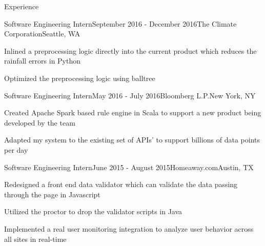\documentclass{resume} %
\begin{document}
\begin{rSection}{Experience}

\begin{rSubsection}{Software Engineering Intern}{September 2016 - December 2016}{The Climate Corporation}{Seattle, WA}
\item Inlined a preprocessing logic directly into the current product which reduces the rainfall errors in Python
\item Optimized the preprocessing logic using balltree

\end{rSubsection}

\begin{rSubsection}{Software Engineering Intern}{May 2016 - July 2016}{Bloomberg L.P.}{New York, NY}
\item Created Apache Spark based rule engine in Scala to support a new product being developed by the team
\item Adapted my system to the existing set of APIs'  to support billions of data points per day
\end{rSubsection}

\begin{rSubsection}{Software Engineering Intern}{June 2015 - August 2015}{Homeaway.com}{Austin, TX}
\item Redesigned a front end data validator which can validate the data passing through the page in Javascript
\item Utilized the proctor to drop the validator scripts  in Java
\item Implemented a real user monitoring integration to analyze user behavior across all sites in real-time  
\end{rSubsection}



\end{rSection}
\end{document}
